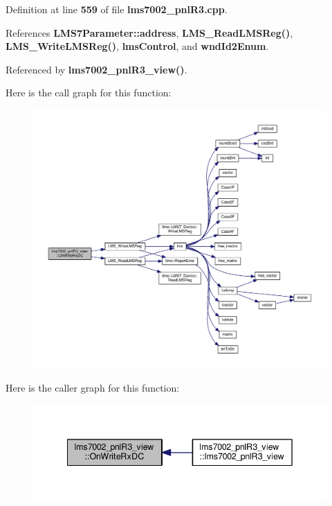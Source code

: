 Definition at line {\bf 559} of file {\bf lms7002\+\_\+pnl\+R3.\+cpp}.



References {\bf L\+M\+S7\+Parameter\+::address}, {\bf L\+M\+S\+\_\+\+Read\+L\+M\+S\+Reg()}, {\bf L\+M\+S\+\_\+\+Write\+L\+M\+S\+Reg()}, {\bf lms\+Control}, and {\bf wnd\+Id2\+Enum}.



Referenced by {\bf lms7002\+\_\+pnl\+R3\+\_\+view()}.



Here is the call graph for this function\+:
\nopagebreak
\begin{figure}[H]
\begin{center}
\leavevmode
\includegraphics[width=350pt]{d5/d55/classlms7002__pnlR3__view_abe1775673b4ff6d703f742a135f50e47_cgraph}
\end{center}
\end{figure}




Here is the caller graph for this function\+:
\nopagebreak
\begin{figure}[H]
\begin{center}
\leavevmode
\includegraphics[width=342pt]{d5/d55/classlms7002__pnlR3__view_abe1775673b4ff6d703f742a135f50e47_icgraph}
\end{center}
\end{figure}


